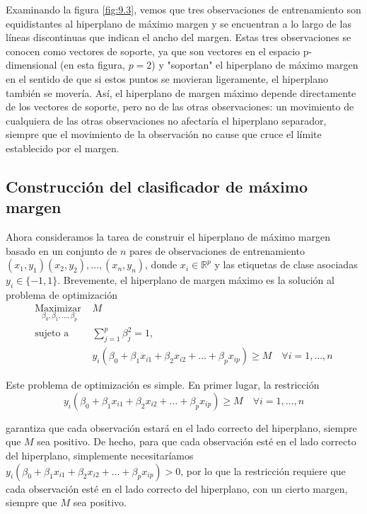 Examinando la figura \ref{fig:9.3}, vemos que tres observaciones de entrenamiento son equidistantes al hiperplano de máximo margen y se encuentran a lo largo de las líneas discontinuas que indican el ancho del margen. Estas tres observaciones se conocen como vectores de soporte, ya que son vectores en el espacio p-dimensional (en esta figura, $p = 2$) y "soportan" el hiperplano de máximo margen en el sentido de que si estos puntos se movieran ligeramente, el hiperplano también se movería. Así, el hiperplano de margen máximo depende directamente de los vectores de soporte, pero no de las otras observaciones: un movimiento de cualquiera de las otras observaciones no afectaría el hiperplano separador, siempre que el movimiento de la observación no cause que cruce el límite establecido por el margen. \\

\subsection{Construcción del clasificador de máximo margen}

Ahora consideramos la tarea de construir el hiperplano de máximo margen basado en un conjunto de $n$ pares de observaciones de entrenamiento $(x_1, y_1) (x_2, y_2), \ldots, (x_n, y_n)$, donde $x_i \in \mathbb{R}^p$ y las etiquetas de clase asociadas $y_i \in \{-1, 1\}$. Brevemente, el hiperplano de margen máximo es la solución al problema de optimización
\begin{align}
\underset{\beta_0, \beta_1, \ldots, \beta_p}{\text{Maximizar }} & M \label{eq:9.9}\\
\text{sujeto a } & \sum_{j = 1}^{p} \beta_j^2 = 1, \label{eq:9.10}\\
& y_i (\beta_0 + \beta_1 x_{i1} + \beta_2 x_{i2} + \ldots + \beta_p x_{ip}) \geq M \quad \forall i = 1, \ldots, n \label{eq:9.11}
\end{align}

\noindent Este problema de optimización es simple. En primer lugar, la restricción 
\begin{equation}
y_i (\beta_0 + \beta_1 x_{i1} + \beta_2 x_{i2} + \ldots + \beta_p x_{ip}) \geq M \quad \forall i = 1, \ldots, n
\end{equation}

garantiza que cada observación estará en el lado correcto del hiperplano, siempre que $M$ sea positivo. De hecho, para que cada observación esté en el lado correcto del hiperplano, simplemente necesitaríamos $y_i (\beta_0 + \beta_1 x_{i1} + \beta_2 x_{i2} + \ldots + \beta_p x_{ip}) > 0$, por lo que la restricción requiere que cada observación esté en el lado correcto del hiperplano, con un cierto margen, siempre que $M$ sea positivo. \\

